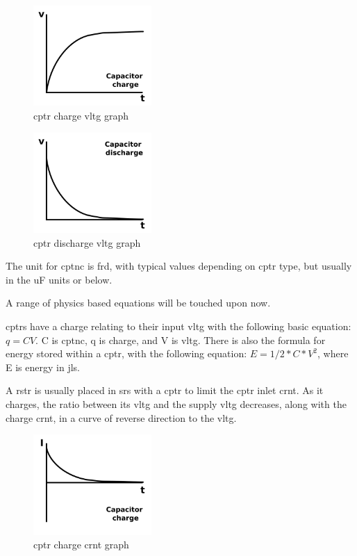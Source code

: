 \documentclass[a4paper,11pt]{report}
\begin{document}
\begin{figure}[H]
\centering
\includegraphics[width=0.4\textwidth]{capacitorcharge}
\caption{\gls{cptr} charge \gls{vltg} graph}
\end{figure}

\begin{figure}[H]
\centering
\includegraphics[width=0.4\textwidth]{capacitordischarge}
\caption{\gls{cptr} discharge \gls{vltg} graph}
\end{figure}

The unit for \gls{cptnc} is \gls{frd}, with typical values depending on \gls{cptr} type, but usually in the uF units or below.

A range of physics based equations will be touched upon now.

\gls{cptr}s have a charge relating to their input \gls{vltg} with the following basic equation: $q = CV$.  C is \gls{cptnc}, q is charge, and V is \gls{vltg}. There is also the formula for energy stored within a \gls{cptr}, with the following equation: $E = 1/2*C*V^2$, where E is energy in \gls{jls}.

A \gls{rstr} is usually placed in \gls{srs} with a \gls{cptr} to limit the \gls{cptr} inlet \gls{crnt}. As it charges, the ratio between its \gls{vltg} and the supply \gls{vltg} decreases, along with the charge \gls{crnt}, in a curve of reverse direction to the \gls{vltg}.

\begin{figure}[H]
\centering
\includegraphics[width=0.4\textwidth]{capacitorchargecurrent}
\caption{\gls{cptr} charge \gls{crnt} graph}
\end{figure}
\end{document}
